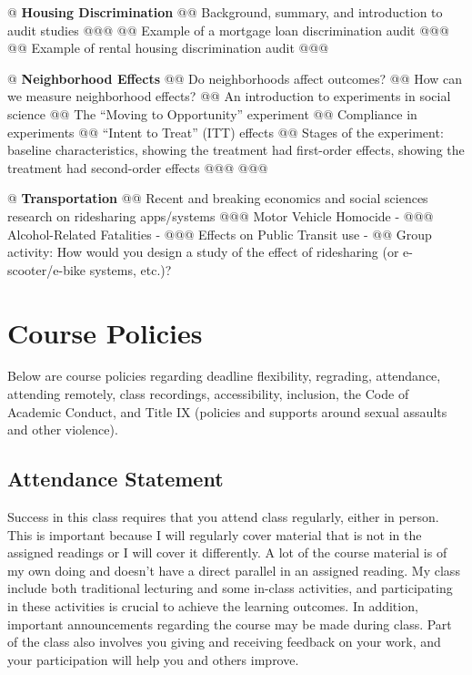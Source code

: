 \documentclass[11pt,letterpaper,final]{article}
\begin{document}
{@ \textbf{Housing Discrimination}
@@ Background, summary, and introduction to audit studies
@@@ \citet{Yinger1998}
@@ Example of a mortgage loan discrimination audit
@@@ \citet{Balfe2019}
@@ Example of rental housing discrimination audit
@@@ \citet{Phillips2016}

@ \textbf{Neighborhood Effects}
@@ Do neighborhoods affect outcomes?
@@ How can we measure neighborhood effects?
@@ An introduction to experiments in social science
@@ The ``Moving to Opportunity'' experiment
@@ Compliance in experiments
@@ ``Intent to Treat'' (ITT) effects
@@ Stages of the experiment: baseline characteristics, showing the treatment had first-order effects, showing the treatment had second-order effects
@@@ \citet{Ludwig2012}
@@@ \citet{Bergman2019}

@ \textbf{Transportation}
@@ Recent and breaking economics and social sciences research on ridesharing apps/systems
@@@ Motor Vehicle Homocide - \citet{Greenwood2017}
@@@ Alcohol-Related Fatalities - \citet{Anderson2021}
@@@ Effects on Public Transit use - \citet{Hall2018}
@@ Group activity: How would you design a study of the effect of ridesharing (or e-scooter/e-bike systems, etc.)? 
}

\section{Course Policies}
Below are course policies regarding deadline flexibility, regrading, attendance, attending remotely, class recordings, accessibility, inclusion, the Code of Academic Conduct, and Title IX (policies and supports around sexual assaults and other violence).
 
\subsection{Attendance Statement} 
Success in this class requires that you attend class regularly, either in person. This is important because I will regularly cover material that is not in the assigned readings or I will cover it differently. A lot of the course material is of my own doing and doesn't have a direct parallel in an assigned reading. My class include both traditional lecturing and some in-class activities, and participating in these activities is crucial to achieve the learning outcomes. In addition, important announcements regarding the course may be made during class. Part of the class also involves you giving and receiving feedback on your work, and your participation will help you and others improve.
\end{document}
